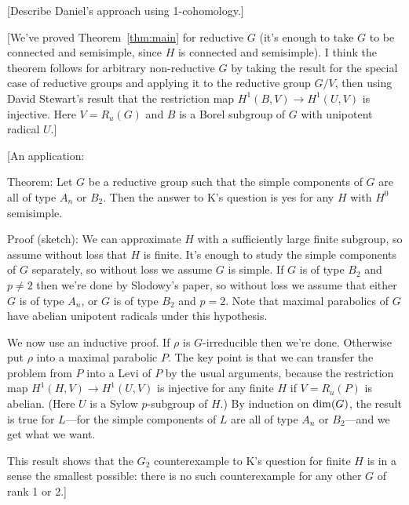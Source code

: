 \documentclass[12pt]{amsart}
\newcommand\ra{\rightarrow}
\numberwithin{equation}{section}
\theoremstyle{definition}
\theoremstyle{remark}
\theoremstyle{remark}
\begin{document}
[Describe Daniel's approach using 1-cohomology.]

[We've proved Theorem~\ref{thm:main} for reductive $G$ (it's enough to take $G$ to be connected and semisimple, since $H$ is connected and semisimple).  I think the theorem follows for arbitrary non-reductive $G$ by taking the result for the special case of reductive groups and applying it to the reductive group $G/V$, then using David Stewart's result that the restriction map $H^1(B,V)\ra H^1(U,V)$ is injective.  Here $V= R_u(G)$ and $B$ is a Borel subgroup of $G$ with unipotent radical $U$.]

[An application:

Theorem: Let $G$ be a reductive group such that the simple components of $G$ are all of type $A_n$ or $B_2$.  Then the answer to K's question is yes for any $H$ with $H^0$ semisimple.

Proof (sketch): We can approximate $H$ with a sufficiently large finite subgroup, so assume without loss that $H$ is finite.  It's enough to study the simple components of $G$ separately, so without loss we assume $G$ is simple.  If $G$ is of type $B_2$ and $p\neq 2$ then we're done by Slodowy's paper, so without loss we assume that either $G$ is of type $A_n$, or $G$ is of type $B_2$ and $p= 2$.  Note that maximal parabolics of $G$ have abelian unipotent radicals under this hypothesis.

We now use an inductive proof.  If $\rho$ is $G$-irreducible then we're done.  Otherwise put $\rho$ into a maximal parabolic $P$.  The key point is that we can transfer the problem from $P$ into a Levi of $P$ by the usual arguments, because the restriction map $H^1(H,V)\ra H^1(U,V)$ is injective for any finite $H$ if $V= R_u(P)$ is abelian.  (Here $U$ is a Sylow $p$-subgroup of $H$.)  By induction on ${\rm dim}(G)$, the result is true for $L$---for the simple components of $L$ are all of type $A_n$ or $B_2$---and we get what we want.

This result shows that the $G_2$ counterexample to K's question for finite $H$ is in a sense the smallest possible: there is no such counterexample for any other $G$ of rank 1 or 2.]
\end{document}

